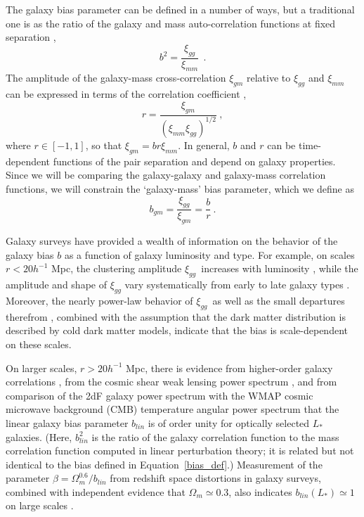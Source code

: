 \documentclass{emulateapj}
\newcommand{\xigg}{$\xi_{gg}$}
\begin{document}
The galaxy 
bias parameter can be defined in a number of ways, but a traditional 
one is as the ratio of the
galaxy and mass auto-correlation functions at fixed
separation \citep{Kaiser84},
\begin{equation} \label{bias_def}
b^2 = \frac{\xi_{gg}}{\xi_{mm}} ~~.
\end{equation}
The amplitude of the galaxy-mass cross-correlation $\xi_{gm}$   
relative to $\xi_{gg}$ and $\xi_{mm}$ can be expressed  
in terms of the correlation coefficient \citep{Pen98}, 
\begin{equation} \label{r_def}
r = \frac{\xi_{gm}}{(\xi_{mm}\xi_{gg})^{1/2}} ~,
\end{equation}
where $r \in [-1,1]$, so that $\xi_{gm} = b r \xi_{mm}$. 
In general, $b$ and $r$ can be time-dependent functions of the pair separation 
and depend on galaxy properties.  
Since we will be comparing the galaxy-galaxy and galaxy-mass 
correlation functions, we will constrain 
the `galaxy-mass' 
bias parameter, which we define as 
\begin{equation} \label{bgmdef}
b_{gm} = \frac{\xi_{gg}}{\xi_{gm}} = \frac{b}{r}~.
\end{equation}

Galaxy surveys have provided a wealth of information on the 
behavior of the galaxy bias $b$ as a function of galaxy luminosity 
and type. For example, on scales $r < 20 h^{-1}$ Mpc, the clustering 
amplitude \xigg\ increases with luminosity 
\citep{Norberg01,Zehavi02,Norberg02,Zehavi04}, 
while the amplitude and shape of $\xi_{gg}$ 
vary systematically from early to late galaxy types 
\citep{Davis76,Norberg01,Zehavi02}. Moreover, 
the nearly power-law behavior of \xigg\, as well 
as the small departures therefrom \citep{Zehavi03}, combined with 
the assumption that the dark matter distribution is 
described by cold dark matter models, indicate that the bias is 
scale-dependent on these scales.

On larger scales, $r > 20 h^{-1}$ Mpc, there is 
evidence from higher-order galaxy correlations 
\citep{Frieman99,Szapudi02,Verde02}, 
from the cosmic shear weak lensing power spectrum 
\citep{Hoekstra02c,Jarvis03},  
and from comparison of the 2dF galaxy power spectrum \citep{Percival01} 
with the WMAP cosmic microwave background (CMB) 
temperature angular power spectrum \citep{Spergel03} 
that the 
linear galaxy bias parameter $b_{lin}$ is of order unity for optically selected  
$L_*$ galaxies. 
(Here, $b_{lin}^2$ is the ratio of the galaxy correlation 
function to the mass correlation function computed in linear perturbation theory; 
it is related but not identical to the bias defined in Equation~\ref{bias_def}.)
Measurement of the parameter $\beta = \Omega_m^{0.6}/b_{lin}$ from 
redshift space distortions in galaxy surveys, combined with independent 
evidence that $\Omega_m \simeq 0.3$, also indicates $b_{lin}(L_*) \simeq 1$ 
on large scales \citep{PeacockNature2001}.
\end{document}
